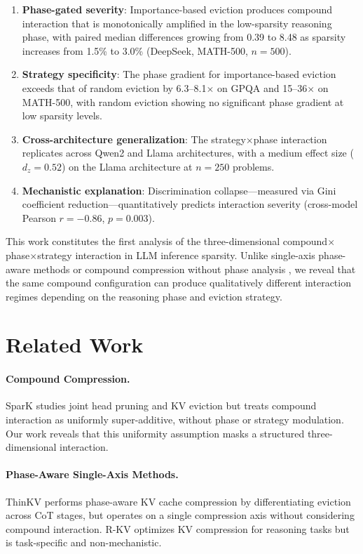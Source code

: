 \documentclass[11pt]{article}
\begin{document}
\begin{enumerate}
\item \textbf{Phase-gated severity}: Importance-based eviction produces compound interaction that is monotonically amplified in the low-sparsity reasoning phase, with paired median differences growing from 0.39 to 8.48 as sparsity increases from 1.5\% to 3.0\% (DeepSeek, MATH-500, $n=500$).
\item \textbf{Strategy specificity}: The phase gradient for importance-based eviction exceeds that of random eviction by 6.3--8.1$\times$ on GPQA and 15--36$\times$ on MATH-500, with random eviction showing no significant phase gradient at low sparsity levels.
\item \textbf{Cross-architecture generalization}: The strategy$\times$phase interaction replicates across Qwen2 and Llama architectures, with a medium effect size ($d_z=0.52$) on the Llama architecture at $n=250$ problems.
\item \textbf{Mechanistic explanation}: Discrimination collapse---measured via Gini coefficient reduction---quantitatively predicts interaction severity (cross-model Pearson $r=-0.86$, $p=0.003$).
\end{enumerate}

This work constitutes the first analysis of the three-dimensional compound$\times$phase$\times$strategy interaction in LLM inference sparsity. Unlike single-axis phase-aware methods \citep{thinkv2025} or compound compression without phase analysis \citep{spark2024}, we reveal that the same compound configuration can produce qualitatively different interaction regimes depending on the reasoning phase and eviction strategy.

\section{Related Work}

\paragraph{Compound Compression.}
SparK \citep{spark2024} studies joint head pruning and KV eviction but treats compound interaction as uniformly super-additive, without phase or strategy modulation. Our work reveals that this uniformity assumption masks a structured three-dimensional interaction.

\paragraph{Phase-Aware Single-Axis Methods.}
ThinKV \citep{thinkv2025} performs phase-aware KV cache compression by differentiating eviction across CoT stages, but operates on a single compression axis without considering compound interaction. R-KV \citep{rkv2025} optimizes KV compression for reasoning tasks but is task-specific and non-mechanistic.
\end{document}
